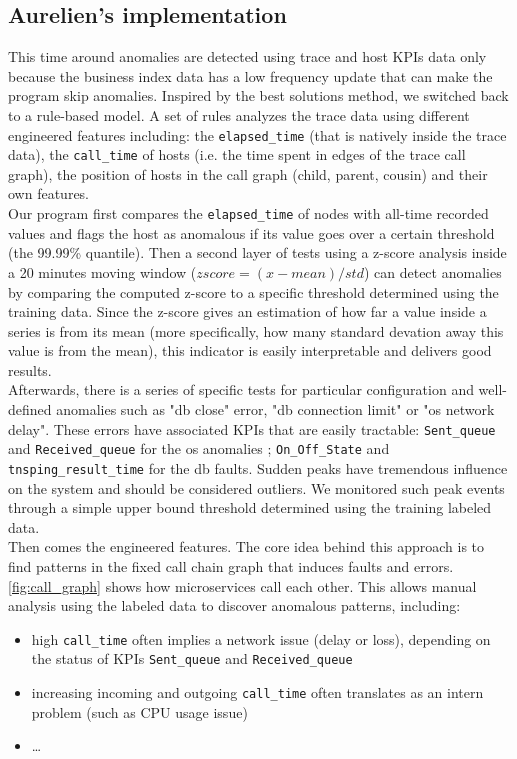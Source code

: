 \documentclass[acmsmall, screen, nonacm]{acmart}
\begin{document}
\subsection{Aurelien's implementation}
This time around anomalies are detected using trace and host KPIs data only because the business index data has a low frequency update that can make the program skip anomalies. 
Inspired by the best solutions method, we switched back to a rule-based model.
A set of rules analyzes the trace data using different engineered features including: the \verb|elapsed_time| (that is natively inside the trace data), the \verb|call_time| of hosts (i.e. the time spent in edges of the trace call graph), the position of hosts in the call graph (child, parent, cousin) and their own features. 
\\
Our program first compares the \verb|elapsed_time| of nodes with all-time recorded values and flags the host as anomalous if its value goes over a certain threshold (the 99.99\% quantile).
Then a second layer of tests using a z-score analysis inside a 20 minutes moving window ($zscore = (x-mean) / std$) can detect anomalies by comparing the computed z-score to a specific threshold determined using the training data.
Since the z-score gives an estimation of how far a value inside a series is from its mean (more specifically, how many standard devation away this value is from the mean), this indicator is easily interpretable and delivers good results. 
\\
Afterwards, there is a series of specific tests for particular configuration and well-defined anomalies such as "db close" error, "db connection limit" or "os network delay".
These errors have associated KPIs that are easily tractable: \verb|Sent_queue| and \verb|Received_queue| for the os anomalies ; \verb|On_Off_State| and \verb|tnsping_result_time| for the db faults. 
Sudden peaks have tremendous influence on the system and should be considered outliers. 
We monitored such peak events through a simple upper bound threshold determined using the training labeled data.  
\\
Then comes the engineered features. 
The core idea behind this approach is to find patterns in the fixed call chain graph that induces faults and errors. 
\autoref{fig:call_graph} shows how microservices call each other. 
This allows manual analysis using the labeled data to discover anomalous patterns, including:
\begin{itemize}
  \item high \verb|call_time| often implies a network issue (delay or loss), depending on the status of KPIs \verb|Sent_queue| and \verb|Received_queue|
  \item increasing incoming and outgoing \verb|call_time| often translates as an intern problem (such as CPU usage issue)
  \item \dots
\end{itemize}
\end{document}
